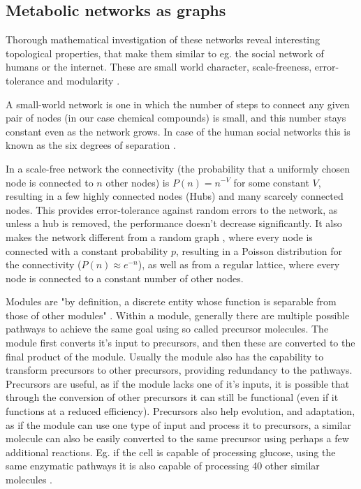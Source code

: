 \documentclass[10pt,a4paper]{article}
\begin{document}
	
	\subsection{Metabolic networks as graphs}
	Thorough mathematical investigation of these networks reveal interesting topological properties, that make them similar to eg. the social network of humans or the internet. These are small world character, scale-freeness, error-tolerance \cite{largescale} and modularity .
	
	A small-world network \cite{smallworld} is one in which the number of steps to connect any given pair of nodes (in our case chemical compounds) is small, and this number stays constant even as the network grows. In case of the human social networks this is known as the six degrees of separation \cite{sixdegrees}.
	 
	In a scale-free network the connectivity (the probability that a uniformly chosen node is connected to $n$ other nodes) is $P(n)=n^{-V}$ for some constant $V$, resulting in a few highly connected nodes (Hubs) and many scarcely connected nodes. This provides error-tolerance against random errors to the network, as unless a hub is removed, the performance doesn't decrease significantly. It also makes the network different from a random graph \cite{randomgraphs}, where every node is connected with a constant probability $p$, resulting in a Poisson distribution for the connectivity ($P(n) \approx e^{-n}$), as well as from a regular lattice, where every node is connected to a constant number of other nodes.
	  
	Modules are "by definition, a discrete entity whose function is separable from those of other modules" \cite{modulardef}. Within a module, generally there are multiple possible pathways to achieve the same goal using so called precursor molecules. The module first converts it's input to precursors, and then these are converted to the final product of the module. Usually the module also has the capability to transform precursors to other precursors, providing redundancy to the pathways. Precursors are useful, as if the module lacks one of it's inputs, it is possible that through the conversion of other precursors it can still be functional (even if it functions at a reduced efficiency). Precursors also help evolution, and adaptation, as if the module can use one type of input and process it to precursors, a similar molecule can also be easily converted to the same precursor using perhaps a few additional reactions. Eg. if the cell is capable of processing glucose, using the same enzymatic pathways it is also capable of processing 40 other similar molecules \cite{latent}.
	
\end{document}
